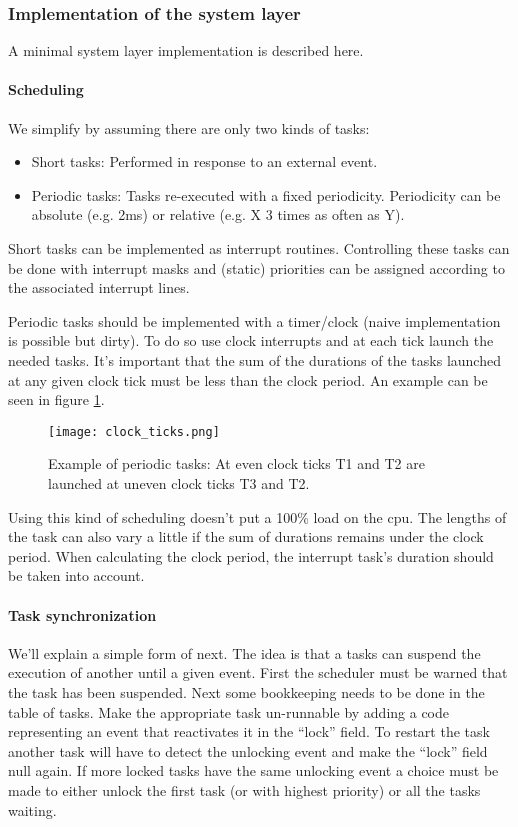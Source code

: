 \subsubsection{Implementation of the system layer}
A minimal  system layer implementation is described here.

\paragraph{Scheduling}
We simplify  by assuming there are only two kinds of tasks:
\begin{itemize}
	\item Short tasks: Performed in response to an external event.
	\item Periodic tasks: Tasks re-executed with a fixed periodicity. Periodicity can be absolute (e.g. 2ms) or relative (e.g. X 3 times as often as Y).
\end{itemize}

Short tasks can be implemented as interrupt routines. 
Controlling these tasks can be done with interrupt masks and (static) priorities can be assigned according to the associated interrupt lines.

Periodic tasks should be implemented with a timer/clock (naive implementation is possible but dirty).
To do so use clock interrupts and at each tick launch the needed tasks.
It's important that the sum of the durations of the tasks launched at any given clock tick must be less than the clock period. 
An example can be seen in figure \ref{f:perd_ex}.

\begin{figure}[H]
	\centering
	\texttt{[image: clock\_ticks.png]}
	\caption{Example of periodic tasks: At even clock ticks T1 and T2 are launched at uneven clock ticks T3 and T2.}
	\label{f:perd_ex}
\end{figure}

Using this kind of scheduling doesn't put a 100\% load on the cpu.
The lengths of the task can also vary a little if the sum of durations remains under the clock period.
When calculating the clock period, the interrupt task's duration should be taken into account.

\paragraph{Task synchronization}
We'll explain a simple form of  next. 
The idea is that a tasks can suspend the execution of another until a given event.
First the scheduler must be warned that the task has been suspended.
Next some bookkeeping needs to be done in the table of tasks.
Make the appropriate task un-runnable by adding a code representing an event that reactivates it in the ``lock'' field.
To restart the task another task will have to detect the unlocking event and make the ``lock'' field null again. 
If more locked tasks have the same unlocking event a choice must be made to either unlock the first task (or with highest priority) or all the tasks waiting. 

